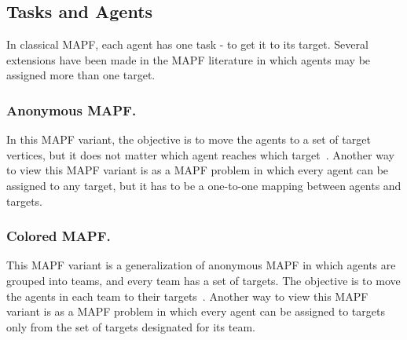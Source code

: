 \documentclass[letterpaper]{article} %
\newcommand{\mapf}{\ac{MAPF}\xspace}
\begin{document}





\subsection{Tasks and Agents}

In classical MAPF, each agent has one task - to get it to its target. Several extensions have been made in the MAPF literature in which agents may be assigned more than one target.

\subsubsection{Anonymous \mapf.}
In this \mapf variant, the objective is to move the agents to a set of target vertices, but it does not matter which agent reaches which target~\cite{kloder2006path,yu2013multi}.
Another way to view this \mapf variant is as a \mapf problem in which every agent can be assigned to any target, but it has to be a one-to-one mapping between agents and targets.

\subsubsection{Colored \mapf.}
This \mapf variant is a generalization of anonymous \mapf in which agents are grouped into teams, and every team has a set of targets. The objective is to move the agents in each team to their targets~\cite{ma2016optimal,solovey2014k}. Another way to view this \mapf variant is as a \mapf problem in which every agent can be assigned to targets only from the set of targets designated for its team.
\end{document}
